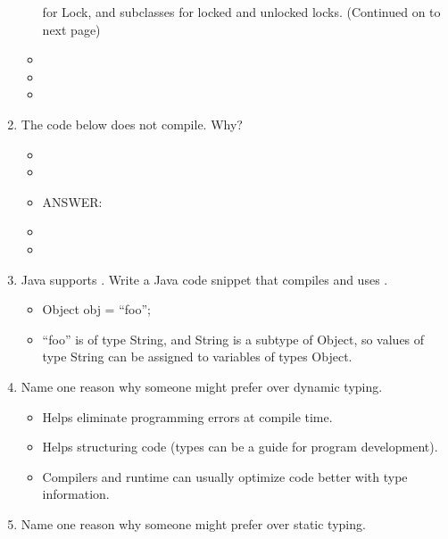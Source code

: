 \documentclass[12pt,a4paper]{article}
\begin{document}
\begin{enumerate}
\begin{itemize}
      for Lock, and subclasses for locked and unlocked locks. (Continued on to next page)
      \clearpage
      \item[] 
      \item[] 
      \item[]   
    \end{itemize}
    \clearpage
    \item The code below does not compile. Why? %
    \begin{itemize}
      \item[] 
      \item[] 
      \item[] ANSWER:\ 
      \item[]    
      \item[]   
    \end{itemize}
    \clearpage
    \item Java supports . Write a Java code snippet that compiles and uses . %
    \begin{itemize}
      \item Object obj = ``foo'';
      \item ``foo'' is of type String, and String is a subtype of Object, so values of type String can be assigned to variables of types Object.
    \end{itemize} 
    \item Name one reason why someone might prefer  over dynamic typing. %
    \begin{itemize}
      \item Helps eliminate programming errors at compile time.
      \item Helps structuring code (types can be a guide for program development).
      \item Compilers and runtime can usually optimize code better with type information.
    \end{itemize}
    \item Name one reason why someone might prefer  over static typing. %
    \begin{itemize}

\end{itemize}
\end{enumerate}
\end{document}
